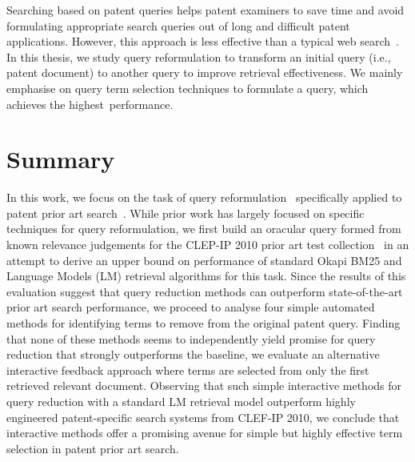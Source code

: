 Searching based on patent queries helps patent examiners to save time and avoid 
formulating appropriate search queries out of long and difficult patent applications. 
 However, this approach is less effective than a typical web search~\citep{lupu2013patent}. 
 In this thesis, we study query reformulation to transform an initial query (i.e., patent document) to another query to improve retrieval effectiveness. We mainly emphasise on query term selection techniques to formulate a query, which achieves the highest~performance.


\section{Summary}
\label{sec:summary}
In this work, we focus on the task of query
reformulation~\citep{Baeza-Yates2011} specifically applied to patent
prior art
search~\citep{mahdabi2014patent,Piroi2010,xue2009transforming}. While
prior work has largely focused on specific techniques for query
reformulation, 
 we first
build an oracular query formed from known relevance judgements for the
CLEP-IP 2010 prior art test collection~\citep{Piroi2010} in an attempt
to derive an upper bound on performance of standard Okapi BM25 and
Language Models (LM) retrieval algorithms for this task.  Since the
results of this evaluation suggest that query reduction methods can
outperform state-of-the-art prior art search performance, 
we proceed to analyse four simple
automated methods for identifying terms to remove from the original
patent query.  Finding that none of these methods seems to
independently yield promise for query reduction that strongly
outperforms the baseline, 
we evaluate an alternative
interactive feedback approach where terms are selected from only the
first retrieved relevant document.  Observing that such simple
interactive methods for query reduction with a standard LM retrieval
model outperform highly engineered patent-specific search systems from
CLEF-IP 2010, we conclude that interactive methods offer a promising
avenue for simple but highly effective term selection in patent prior
art search.

